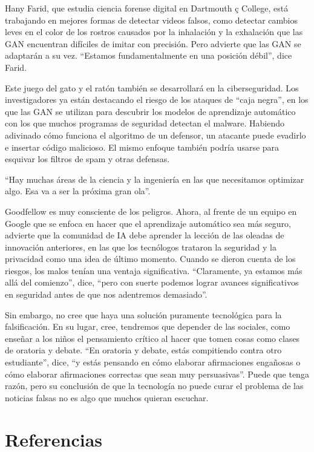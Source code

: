 \documentclass[a4paper]{article}
\begin{document}
 Hany Farid, que estudia ciencia forense digital en Dartmouth ç 
 College, está trabajando en mejores formas de detectar videos  
 falsos, como detectar cambios leves en el color de los rostros  
 causados por la inhalación y la exhalación que las GAN encuentran 
 difíciles de imitar con precisión. Pero advierte que las GAN se  
 adaptarán a su vez. ``Estamos fundamentalmente en una posición  
 débil'', dice Farid.



Este juego del gato y el ratón también se desarrollará en la 
ciberseguridad. Los investigadores ya están destacando el riesgo 
de los ataques de ``caja negra'', en los que las GAN se utilizan 
para descubrir los modelos de aprendizaje automático con los que 
muchos programas de seguridad detectan el malware. Habiendo 
adivinado cómo funciona el algoritmo de un defensor, un atacante 
puede evadirlo e insertar código malicioso. El mismo enfoque 
también podría usarse para esquivar los filtros de spam y otras 
defensas.

``Hay muchas áreas de la ciencia y la ingeniería en las que 
necesitamos optimizar algo. Esa va a ser la próxima gran ola''.

Goodfellow es muy consciente de los peligros. Ahora, al frente de 
un equipo en Google que se enfoca en hacer que el aprendizaje 
automático sea más seguro, advierte que la comunidad de IA debe 
aprender la lección de las oleadas de innovación anteriores, en 
las que los tecnólogos trataron la seguridad y la privacidad como 
una idea de último momento. Cuando se dieron cuenta de los 
riesgos, los malos tenían una ventaja significativa. ``Claramente, 
ya estamos más allá del comienzo'', dice, ``pero con suerte 
podemos lograr avances significativos en seguridad antes de que 
nos adentremos demasiado''.

Sin embargo, no cree que haya una solución puramente tecnológica 
para la falsificación. En su lugar, cree, tendremos que depender 
de las sociales, como enseñar a los niños el pensamiento crítico 
al hacer que tomen cosas como clases de oratoria y debate. ``En 
oratoria y debate, estás compitiendo contra otro estudiante'', 
dice, ``y estás pensando en cómo elaborar afirmaciones engañosas o 
cómo elaborar afirmaciones correctas que sean muy persuasivas''. 
Puede que tenga razón, pero su conclusión de que la tecnología no 
puede curar el problema de las noticias falsas no es algo que 
muchos quieran escuchar.


\section{Referencias}
\end{document}
